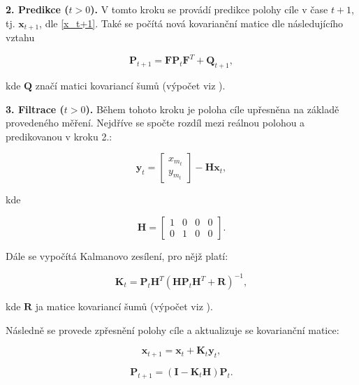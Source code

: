 \documentclass[twoside]{ctuthesis}
\theoremstyle{plain}
\theoremstyle{definition}
\theoremstyle{note}
\begin{document}
\textbf{2. Predikce ($t > 0$).} V tomto kroku se provádí predikce polohy cíle v čase $t + 1$, tj. $\boldsymbol{x}_{t+1}$, dle \ref{x_t+1}. Také se počítá nová kovarianční matice dle následujícího vztahu

\begin{equation}
\boldsymbol{P}_{t+1} = \boldsymbol{F}\boldsymbol{P}_t\boldsymbol{F}^T + \boldsymbol{Q}_{t+1},
\end{equation}

kde $\boldsymbol{Q}$ značí matici kovariancí šumů (výpočet viz \cite{cite:11}).

\textbf{3. Filtrace ($t > 0$).} Během tohoto kroku je poloha cíle upřesněna na základě provedeného měření. Nejdříve se spočte rozdíl mezi reálnou polohou a predikovanou v kroku 2.:

\begin{equation}
\boldsymbol{y}_{t} = \begin{bmatrix}
x_{m_t}\\y_{m_t}
\end{bmatrix} - \boldsymbol{H}\boldsymbol{x}_t,
\end{equation}

kde

\begin{equation}
\boldsymbol{H} = \begin{bmatrix}
1&0&0&0\\
0&1&0&0
\end{bmatrix}.
\end{equation}

Dále se vypočítá Kalmanovo zesílení, pro nějž platí:

\begin{equation}
\boldsymbol{K}_t = \boldsymbol{P}_t\boldsymbol{H}^T(\boldsymbol{H}\boldsymbol{P}_t\boldsymbol{H}^T + \boldsymbol{R})^{-1},
\end{equation}

kde $\boldsymbol{R}$ ja matice kovariancí šumů (výpočet viz \cite{cite:11}).

Následně se provede zpřesnění polohy cíle a aktualizuje se kovarianční matice:

\begin{equation}
\boldsymbol{x}_{t+1} = \boldsymbol{x}_t + \boldsymbol{K}_t\boldsymbol{y}_t,
\end{equation}

\begin{equation}
\boldsymbol{P}_{t+1} = (\boldsymbol{I} - \boldsymbol{K}_t\boldsymbol{H})\boldsymbol{P}_t.
\end{equation}
\end{document}
